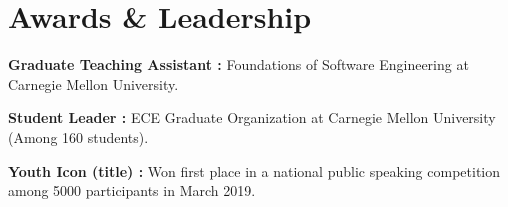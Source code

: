 \documentclass[letterpaper]{article}
\newcommand{\shortSection}[1]{
    \vspace{-6pt}
    \section{#1}
}
\newcommand*{\skill}[2]{
  \textbf{#1 : }#2 \\
  \vspace{1pt}
}
\begin{document}
\shortSection{Awards \& Leadership}
\skill{Graduate Teaching Assistant}{Foundations of Software Engineering at Carnegie Mellon University.}
\skill{Student Leader}{ECE Graduate Organization at Carnegie Mellon University (Among 160 students).}
\skill{Youth Icon (title)}{Won first place in a national public speaking competition among 5000 participants in March 2019.}
\end{document}
